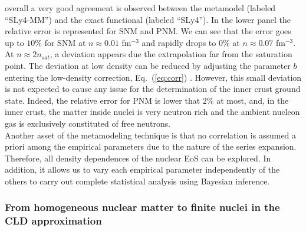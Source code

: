 overall a very good agreement is observed between the metamodel (labeled
``SLy4-MM'') and the exact functional (labeled ``SLy4''). In the lower panel 
the relative error is represented for
SNM and PNM. We can see that the error goes up to $10\%$ for SNM at $n \approx
0.01$ fm$^{-3}$ and rapidly drops to $0\%$ at $n \approx 0.07$
fm$^{-3}$. At $n \approx 2n_{sat}$, a deviation appears due the extrapolation far
from the saturation point. The deviation at low density can be reduced by 
adjusting the parameter $b$ entering the low-density correction,
Eq.~(\ref{eq:corr}) \cite{Antic2019}. However,
this small deviation is not expected to cause any issue for the determination
of the inner crust ground state. Indeed, the relative error for PNM is lower 
that $2\%$ at most, and, in the inner crust, the matter inside nuclei is very 
neutron rich and the ambient nucleon gas is exclusively constituted of free
neutrons. \\
Another asset of the metamodeling technique is that no correlation is assumed
a priori among the empirical parameters due to the nature of the
series expansion. Therefore, all density dependences of the
nuclear EoS can be explored. In addition, it allows us to vary each empirical 
parameter independently of the others to carry out complete statistical 
analysis using Bayesian inference. 

\subsubsection{From homogeneous nuclear matter to finite nuclei in the CLD 
approximation}\label{subsubsec:cld}

